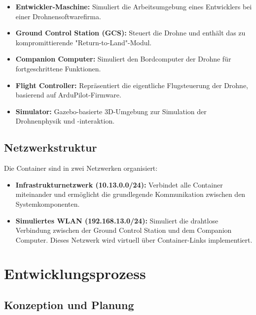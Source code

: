 \documentclass[12pt]{scrartcl}
\begin{document}
    \begin{itemize}
        \item \textbf{Entwickler-Maschine:} Simuliert die Arbeitsumgebung eines Entwicklers bei einer Drohnensoftwarefirma.
        
        \item \textbf{Ground Control Station (GCS):} Steuert die Drohne und enthält das zu kompromittierende "Return-to-Land"-Modul.
        
        \item \textbf{Companion Computer:} Simuliert den Bordcomputer der Drohne für fortgeschrittene Funktionen.
        
        \item \textbf{Flight Controller:} Repräsentiert die eigentliche Flugsteuerung der Drohne, basierend auf ArduPilot-Firmware.
        
        \item \textbf{Simulator:} Gazebo-basierte 3D-Umgebung zur Simulation der Drohnenphysik und -interaktion.
    \end{itemize}
    
    \subsection{Netzwerkstruktur}
    
    Die Container sind in zwei Netzwerken organisiert:
    
    \begin{itemize}
        \item \textbf{Infrastrukturnetzwerk (10.13.0.0/24):} Verbindet alle Container miteinander und ermöglicht die grundlegende Kommunikation zwischen den Systemkomponenten.
        
        \item \textbf{Simuliertes WLAN (192.168.13.0/24):} Simuliert die drahtlose Verbindung zwischen der Ground Control Station und dem Companion Computer. Dieses Netzwerk wird virtuell über Container-Links implementiert.
    \end{itemize}

    \section{Entwicklungsprozess}
    
    \subsection{Konzeption und Planung}
    
\end{document}
